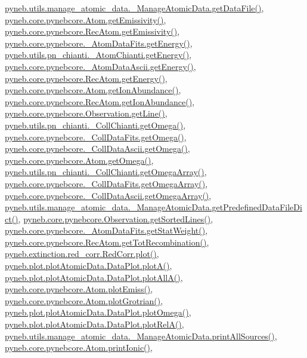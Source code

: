 \hyperlink{manage__atomic__data_8py_source_l00297}{pyneb.\-utils.\-manage\-\_\-atomic\-\_\-data.\-\_\-\-Manage\-Atomic\-Data.\-get\-Data\-File()}, \hyperlink{pynebcore_8py_source_l01782}{pyneb.\-core.\-pynebcore.\-Atom.\-get\-Emissivity()}, \hyperlink{pynebcore_8py_source_l02990}{pyneb.\-core.\-pynebcore.\-Rec\-Atom.\-get\-Emissivity()}, \hyperlink{pynebcore_8py_source_l00275}{pyneb.\-core.\-pynebcore.\-\_\-\-Atom\-Data\-Fits.\-get\-Energy()}, \hyperlink{pn__chianti_8py_source_l00366}{pyneb.\-utils.\-pn\-\_\-chianti.\-\_\-\-Atom\-Chianti.\-get\-Energy()}, \hyperlink{pynebcore_8py_source_l00537}{pyneb.\-core.\-pynebcore.\-\_\-\-Atom\-Data\-Ascii.\-get\-Energy()}, \hyperlink{pynebcore_8py_source_l02927}{pyneb.\-core.\-pynebcore.\-Rec\-Atom.\-get\-Energy()}, \hyperlink{pynebcore_8py_source_l02176}{pyneb.\-core.\-pynebcore.\-Atom.\-get\-Ion\-Abundance()}, \hyperlink{pynebcore_8py_source_l03083}{pyneb.\-core.\-pynebcore.\-Rec\-Atom.\-get\-Ion\-Abundance()}, \hyperlink{pynebcore_8py_source_l03665}{pyneb.\-core.\-pynebcore.\-Observation.\-get\-Line()}, \hyperlink{pn__chianti_8py_source_l00507}{pyneb.\-utils.\-pn\-\_\-chianti.\-\_\-\-Coll\-Chianti.\-get\-Omega()}, \hyperlink{pynebcore_8py_source_l00828}{pyneb.\-core.\-pynebcore.\-\_\-\-Coll\-Data\-Fits.\-get\-Omega()}, \hyperlink{pynebcore_8py_source_l01082}{pyneb.\-core.\-pynebcore.\-\_\-\-Coll\-Data\-Ascii.\-get\-Omega()}, \hyperlink{pynebcore_8py_source_l01324}{pyneb.\-core.\-pynebcore.\-Atom.\-get\-Omega()}, \hyperlink{pn__chianti_8py_source_l00484}{pyneb.\-utils.\-pn\-\_\-chianti.\-\_\-\-Coll\-Chianti.\-get\-Omega\-Array()}, \hyperlink{pynebcore_8py_source_l00800}{pyneb.\-core.\-pynebcore.\-\_\-\-Coll\-Data\-Fits.\-get\-Omega\-Array()}, \hyperlink{pynebcore_8py_source_l01058}{pyneb.\-core.\-pynebcore.\-\_\-\-Coll\-Data\-Ascii.\-get\-Omega\-Array()}, \hyperlink{manage__atomic__data_8py_source_l00034}{pyneb.\-utils.\-manage\-\_\-atomic\-\_\-data.\-\_\-\-Manage\-Atomic\-Data.\-get\-Predefined\-Data\-File\-Dict()}, \hyperlink{pynebcore_8py_source_l03684}{pyneb.\-core.\-pynebcore.\-Observation.\-get\-Sorted\-Lines()}, \hyperlink{pynebcore_8py_source_l00249}{pyneb.\-core.\-pynebcore.\-\_\-\-Atom\-Data\-Fits.\-get\-Stat\-Weight()}, \hyperlink{pynebcore_8py_source_l02851}{pyneb.\-core.\-pynebcore.\-Rec\-Atom.\-get\-Tot\-Recombination()}, \hyperlink{red__corr_8py_source_l00303}{pyneb.\-extinction.\-red\-\_\-corr.\-Red\-Corr.\-plot()}, \hyperlink{plot_atomic_data_8py_source_l00117}{pyneb.\-plot.\-plot\-Atomic\-Data.\-Data\-Plot.\-plot\-A()}, \hyperlink{plot_atomic_data_8py_source_l00189}{pyneb.\-plot.\-plot\-Atomic\-Data.\-Data\-Plot.\-plot\-All\-A()}, \hyperlink{pynebcore_8py_source_l02384}{pyneb.\-core.\-pynebcore.\-Atom.\-plot\-Emiss()}, \hyperlink{pynebcore_8py_source_l02443}{pyneb.\-core.\-pynebcore.\-Atom.\-plot\-Grotrian()}, \hyperlink{plot_atomic_data_8py_source_l00373}{pyneb.\-plot.\-plot\-Atomic\-Data.\-Data\-Plot.\-plot\-Omega()}, \hyperlink{plot_atomic_data_8py_source_l00262}{pyneb.\-plot.\-plot\-Atomic\-Data.\-Data\-Plot.\-plot\-Rel\-A()}, \hyperlink{manage__atomic__data_8py_source_l00431}{pyneb.\-utils.\-manage\-\_\-atomic\-\_\-data.\-\_\-\-Manage\-Atomic\-Data.\-print\-All\-Sources()}, \hyperlink{pynebcore_8py_source_l02233}{pyneb.\-core.\-pynebcore.\-Atom.\-print\-Ionic()}, 